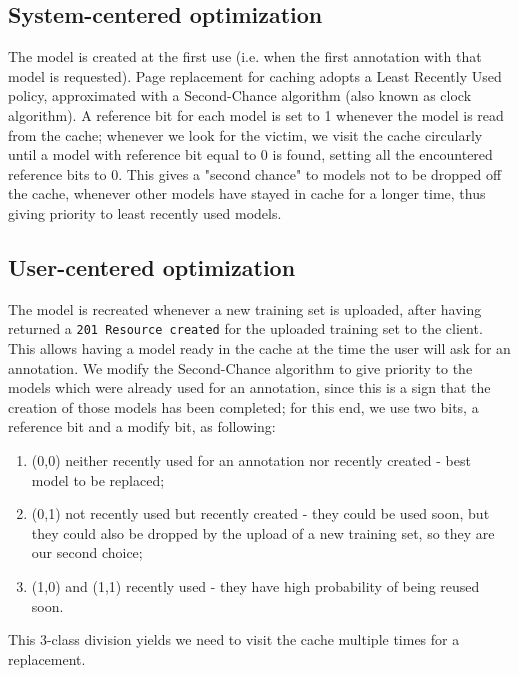 \documentclass[a4paper,11pt]{report}
\begin{document}
\subsection*{System-centered optimization}
The model is created at the first use (i.e. when the first annotation with that model is requested). Page replacement for caching adopts a Least Recently Used policy, approximated with a Second-Chance algorithm (also known as clock algorithm). A reference bit for each model is set to 1 whenever the model is read from the cache; whenever we look for the victim, we visit the cache circularly until a model with reference bit equal to 0 is found, setting all the encountered reference bits to 0. This gives a "second chance" to models not to be dropped off the cache, whenever other models have stayed in cache for a longer time, thus giving priority to least recently used models.
\subsection*{User-centered optimization}
The model is recreated whenever a new training set is uploaded, after having returned a \texttt{201 Resource created} for the uploaded training set to the client. This allows having a model ready in the cache at the time the user will ask for an annotation. We modify the Second-Chance algorithm to give priority to the models which were already used for an annotation, since this is a sign that the creation of those models has been completed; for this end, we use two bits, a reference bit and a modify bit, as following:
\begin{enumerate}
\item (0,0) neither recently used for an annotation nor recently created - best model to be replaced;
\item (0,1) not recently used but recently created - they could be used soon, but they could also be dropped by the upload of a new training set, so they are our second choice;
\item (1,0) and (1,1) recently used - they have high probability of being reused soon.
\end{enumerate}
This 3-class division yields we need to visit the cache multiple times for a replacement.
\end{document}
